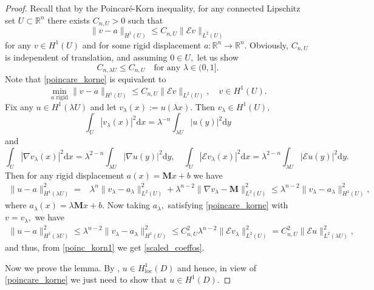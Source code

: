 \documentclass[reqno]{amsart}
\numberwithin{equation}{section}
\theoremstyle{plain}
\theoremstyle{definition}
\newcommand{\R}{\mathbb{R}}
\newcommand{\bM}{\mathbf{M}}
\renewcommand{\d}{\mathrm{d}}
\newcommand{\loc}{\mathrm{loc}}
\newcommand{\str}[1]{\mathcal{E}#1}
\begin{document}
\begin{proof}
Recall that by the Poincar\'e-Korn inequality, for any connected Lipschitz set $U\subset\R^n$ there exists $C_{n,U}>0$ such that
\begin{equation}\label{poincare_korne}
\|v-a\|_{H^1(U)} \le C_{n,U}\|\str{v}\|_{L^2(U)}
\end{equation}
%
for any $v\in H^1(U)$ and for some rigid displacement $a:\R^n\to\R^n.$ Obviously, $C_{n,U}$ is independent of translation, and assuming $0\in U,$  let us show
\begin{equation}\label{scaled_coeffos}
C_{n,\lambda U} \le C_{n,U}\quad \text{for any $\lambda\in(0,1].$}
\end{equation}
Note that \eqref{poincare_korne} is equivalent to
\begin{equation}\label{poinc_korn1}
\min\limits_{\text{$a$ rigid}} \|v-a\|_{H^1(U)} \le C_{n,U}\|\str{v}\|_{L^2(U)},\quad  v\in H^1(U).
\end{equation}
Fix any $u\in H^1(\lambda U)$ and let $v_\lambda(x):=u(\lambda x).$ Then $v_\lambda\in H^1(U),$ 
$$
\int_U |v_\lambda(x)|^2\d x = \lambda^{-n} \int_{\lambda U} |u(y)|^2\d y
$$
and 
$$ 
\int_U |\nabla v_\lambda(x)|^2\d x = \lambda^{2-n} \int_{\lambda U} |\nabla u(y)|^2\d y,\quad 
\int_U |\str{ v_\lambda(x)}|^2\d x = \lambda^{2-n} \int_{\lambda U} |\str{u(y})|^2\d y.
$$
Then for any rigid displacement $a(x)=\bM x+ b$ we have 
\begin{align*}
\| u - a\|_{H^1(\lambda U)}^2 = &
\lambda^n \|v_\lambda - a_\lambda\|_{L^2(U)}^2 + 
\lambda^{n-2} \|\nabla v_\lambda - \bM\|_{L^2(U)}^2
\le \lambda^{n-2} \|v_\lambda - a_\lambda\|_{H^1(U)}^2,
\end{align*}
where  $a_\lambda(x) = \lambda \bM x + b.$ Now taking $a_\lambda,$ satisfying \eqref{poincare_korne} with $v=v_\lambda,$ we have 
\begin{align*}
\| u - a\|_{H^1(\lambda U)}^2 
\le \lambda^{n-2}\|v_\lambda - a_\lambda\|_{H^1(U)}^2 
\le C_{n,U}^2\lambda^{n-2}\|\str{v_\lambda}\|_{L^2(U)}^2 =
 C_{n,U}^2\|\str{u}\|_{L^2(\lambda U)}^2,
\end{align*}
and thus, from \eqref{poinc_korn1} we get \eqref{scaled_coeffos}.

Now we prove the lemma. By \cite[Proposition A.3]{HP:2021_arxiv}, $u\in H^1_\loc(D)$ and hence, in view of  \eqref{poincare_korne} we just need to show that $u\in H^1(D).$


\end{proof}
\end{document}
